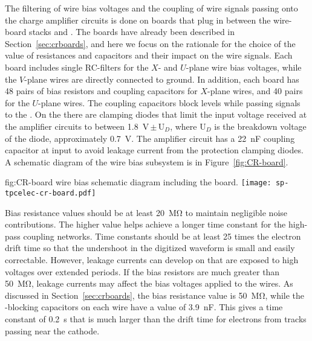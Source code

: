 The filtering of wire bias voltages and the  coupling 
of wire signals passing onto the charge amplifier circuits is 
done on  boards that plug in between the  
wire-board stacks and . The  boards
have already been described in Section~\ref{sec:crboards},
and here we focus on the rationale for the choice of the
value of resistances and capacitors and their impact on the
wire signals. Each  board includes single RC-filters 
for the $X$- and $U$-plane wire bias voltages, while the $V$-plane 
wires are directly connected to ground. In addition, each board 
has \num{48} pairs of bias resistors and  coupling 
capacitors for $X$-plane wires, and \num{40} pairs for the $U$-plane 
wires. The coupling capacitors block  levels while passing  
signals to the . On the  there are clamping
diodes that limit the input voltage received at the amplifier
circuits to between \SI{1.8}{V}\,$\pm$\,U$_D$, where U$_D$
is the breakdown voltage of the diode, approximately \SI{0.7}{V}.
The amplifier circuit has a \SI{22}{nF} coupling capacitor at
input to avoid leakage current from the protection clamping diodes.
A schematic diagram of the   wire bias 
subsystem is in Figure~\ref{fig:CR-board}.

\begin{dunefigure}
{fig:CR-board}
{  wire bias schematic diagram including the  board.}
\texttt{[image: sp-tpcelec-cr-board.pdf]}
\end{dunefigure}

Bias resistance values should be at least \SI{20}{\mega\ohm} to 
maintain negligible noise contributions. The higher value helps 
achieve a longer time constant for the high-pass coupling networks.
Time constants should be at least \num{25} times the electron 
drift time so that the undershoot in the digitized waveform
is small and easily correctable. However, leakage currents can 
develop on  that are exposed to high voltages over 
extended periods. If the bias resistors are much greater than 
\SI{50}{\mega\ohm}, leakage currents may affect the bias voltages 
applied to the wires. As discussed in Section~\ref{sec:crboards},
the bias resistance value is \SI{50}{\mega\ohm}, while the 
-blocking capacitors on each wire have a value of
\SI{3.9}{nF}. This gives a time constant of \SI{0.2}{s} that
is much larger than the drift time for electrons from tracks
passing near the cathode.

